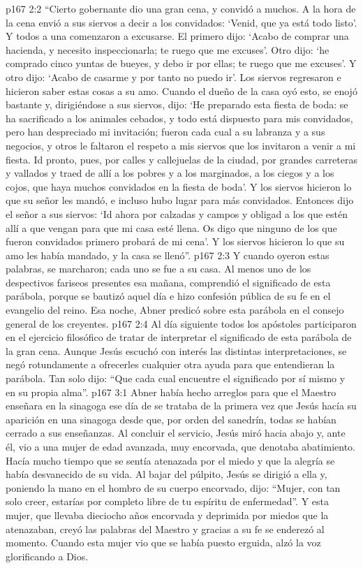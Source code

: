 \vs p167 2:2 “Cierto gobernante dio una gran cena, y convidó a muchos. A la hora de la cena envió a sus siervos a decir a los convidados: ‘Venid, que ya está todo listo’. Y todos a una comenzaron a excusarse. El primero dijo: ‘Acabo de comprar una hacienda, y necesito inspeccionarla; te ruego que me excuses’. Otro dijo: ‘he comprado cinco yuntas de bueyes, y debo ir por ellas; te ruego que me excuses’. Y otro dijo: ‘Acabo de casarme y por tanto no puedo ir’. Los siervos regresaron e hicieron saber estas cosas a su amo. Cuando el dueño de la casa oyó esto, se enojó bastante y, dirigiéndose a sus siervos, dijo: ‘He preparado esta fiesta de boda: se ha sacrificado a los animales cebados, y todo está dispuesto para mis convidados, pero han despreciado mi invitación; fueron cada cual a su labranza y a sus negocios, y otros le faltaron el respeto a mis siervos que los invitaron a venir a mi fiesta. Id pronto, pues, por calles y callejuelas de la ciudad, por grandes carreteras y vallados y traed de allí a los pobres y a los marginados, a los ciegos y a los cojos, que haya muchos convidados en la fiesta de boda’. Y los siervos hicieron lo que su señor les mandó, e incluso hubo lugar para más convidados. Entonces dijo el señor a sus siervos: ‘Id ahora por calzadas y campos y obligad a los que estén allí a que vengan para que mi casa esté llena. Os digo que ninguno de los que fueron convidados primero probará de mi cena’. Y los siervos hicieron lo que su amo les había mandado, y la casa se llenó”.
\vs p167 2:3 \pc Y cuando oyeron estas palabras, se marcharon; cada uno se fue a su casa. Al menos uno de los despectivos fariseos presentes esa mañana, comprendió el significado de esta parábola, porque se bautizó aquel día e hizo confesión pública de su fe en el evangelio del reino. Esa noche, Abner predicó sobre esta parábola en el consejo general de los creyentes.
\vs p167 2:4 Al día siguiente todos los apóstoles participaron en el ejercicio filosófico de tratar de interpretar el significado de esta parábola de la gran cena. Aunque Jesús escuchó con interés las distintas interpretaciones, se negó rotundamente a ofrecerles cualquier otra ayuda para que entendieran la parábola. Tan solo dijo: “Que cada cual encuentre el significado por sí mismo y en su propia alma”.
\vs p167 3:1 Abner había hecho arreglos para que el Maestro enseñara en la sinagoga ese día de  se trataba de la primera vez que Jesús hacía su aparición en una sinagoga desde que, por orden del sanedrín, todas se habían cerrado a sus enseñanzas. Al concluir el servicio, Jesús miró hacia abajo y, ante él, vio a una mujer de edad avanzada, muy encorvada, que denotaba abatimiento. Hacía mucho tiempo que se sentía atenazada por el miedo y que la alegría se había desvanecido de su vida. Al bajar del púlpito, Jesús se dirigió a ella y, poniendo la mano en el hombro de su cuerpo encorvado, dijo: “Mujer, con tan solo creer, estarías por completo libre de tu espíritu de enfermedad”. Y esta mujer, que llevaba dieciocho años encorvada y deprimida por miedos que la atenazaban, creyó las palabras del Maestro y gracias a su fe se enderezó al momento. Cuando esta mujer vio que se había puesto erguida, alzó la voz glorificando a Dios.
